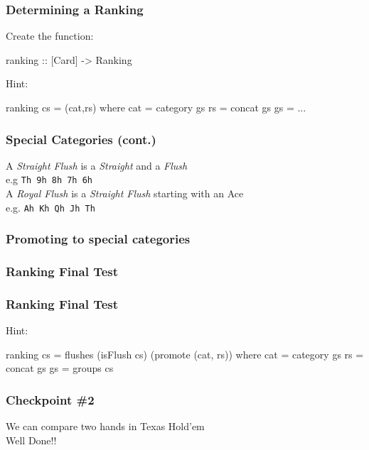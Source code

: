\documentclass[11pt,xcolor={dvipsnames}]{beamer}
\newcommand{\vs}{\vspace{1em}}
\newcommand{\lstH}[1]{}
\newcommand{\lstT}[1]{}
\begin{document}
\begin{frame}[fragile]
\frametitle{Determining a Ranking}
Create the function:
\begin{haskell}[frame=none]
ranking :: [Card] -> Ranking
\end{haskell}
\lstT{048}
Hint:
\begin{haskell}
ranking cs = (cat,rs)
where
    cat = category gs
    rs  = concat gs
    gs  =  ...
\end{haskell}
\end{frame}
\begin{frame}[fragile]
\frametitle{Special Categories (cont.)}
A \emph{Straight Flush} is a \emph{Straight} and a \emph{Flush} \\
\vs
e.g \texttt{Th 9h 8h 7h 6h}\\
\vs
A \emph{Royal Flush} is a \emph{Straight Flush} starting with an Ace\\
\vs
e.g. \texttt{Ah Kh Qh Jh Th}\\
\vs
\end{frame}
\begin{frame}[fragile]
\frametitle{Promoting to special categories}
\lstH{050}
\end{frame}
\begin{frame}[fragile]
\frametitle{Ranking Final Test}
\end{frame}
\begin{frame}[fragile]
\frametitle{Ranking Final Test}
Hint:
\begin{haskell}
ranking cs = flushes (isFlush cs) (promote (cat, rs))
where
cat = category gs
rs  = concat   gs
gs  = groups   cs
\end{haskell}
\end{frame}
\begin{frame}
\frametitle{Checkpoint \#2}
\begin{center}
We can compare two hands in Texas Hold'em\\
\vs
\Large{Well Done!!}
\end{center}
\end{frame}
\end{document}

